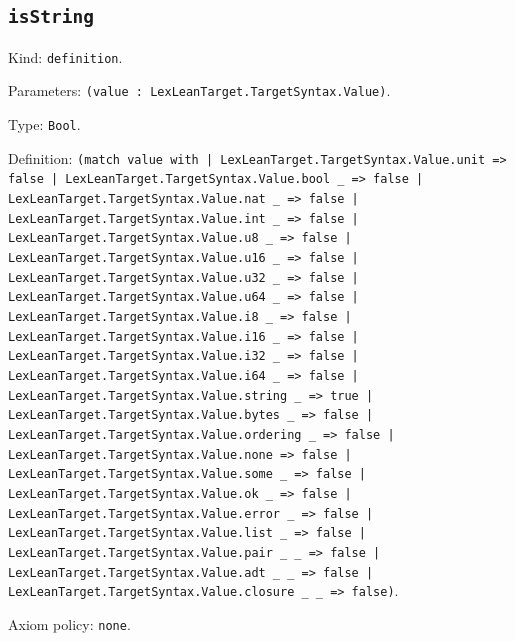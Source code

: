 \documentclass[11pt]{article}
\begin{document}
\subsection*{\texttt{isString}}
\noindent Kind: \texttt{definition}.\par
\noindent Parameters: \texttt{(value : LexLeanTarget.TargetSyntax.Value)}.\par
\noindent Type: \texttt{Bool}.\par
\noindent Definition: \texttt{(match value with | LexLeanTarget.TargetSyntax.Value.unit => false | LexLeanTarget.TargetSyntax.Value.bool \_ => false | LexLeanTarget.TargetSyntax.Value.nat \_ => false | LexLeanTarget.TargetSyntax.Value.int \_ => false | LexLeanTarget.TargetSyntax.Value.u8 \_ => false | LexLeanTarget.TargetSyntax.Value.u16 \_ => false | LexLeanTarget.TargetSyntax.Value.u32 \_ => false | LexLeanTarget.TargetSyntax.Value.u64 \_ => false | LexLeanTarget.TargetSyntax.Value.i8 \_ => false | LexLeanTarget.TargetSyntax.Value.i16 \_ => false | LexLeanTarget.TargetSyntax.Value.i32 \_ => false | LexLeanTarget.TargetSyntax.Value.i64 \_ => false | LexLeanTarget.TargetSyntax.Value.string \_ => true | LexLeanTarget.TargetSyntax.Value.bytes \_ => false | LexLeanTarget.TargetSyntax.Value.ordering \_ => false | LexLeanTarget.TargetSyntax.Value.none => false | LexLeanTarget.TargetSyntax.Value.some \_ => false | LexLeanTarget.TargetSyntax.Value.ok \_ => false | LexLeanTarget.TargetSyntax.Value.error \_ => false | LexLeanTarget.TargetSyntax.Value.list \_ => false | LexLeanTarget.TargetSyntax.Value.pair \_ \_ => false | LexLeanTarget.TargetSyntax.Value.adt \_ \_ => false | LexLeanTarget.TargetSyntax.Value.closure \_ \_ => false)}.\par
\noindent Axiom policy: \texttt{none}.\par
\end{document}
